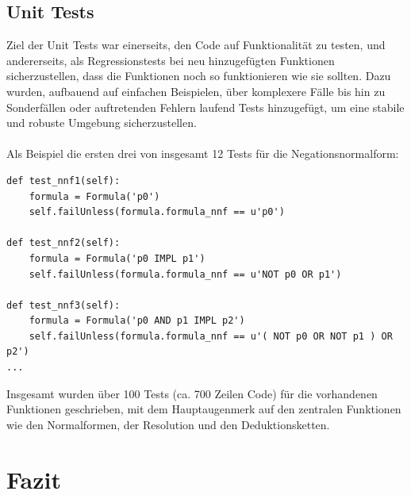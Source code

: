 \documentclass[11pt,a4paper,ngerman]{scrreprt}
\begin{document}
\section{Unit Tests}
Ziel der Unit Tests war einerseits, den Code auf Funktionalität zu testen, und andererseits, als Regressionstests bei neu hinzugefügten Funktionen sicherzustellen, dass die Funktionen noch so funktionieren wie sie sollten. Dazu wurden, aufbauend auf einfachen Beispielen, über komplexere Fälle bis hin zu Sonderfällen oder auftretenden Fehlern laufend Tests hinzugefügt, um eine stabile und robuste Umgebung sicherzustellen.\\\\
Als Beispiel die ersten drei von insgesamt 12 Tests für die Negationsnormalform:
\begin{lstlisting}
def test_nnf1(self):
    formula = Formula('p0')
    self.failUnless(formula.formula_nnf == u'p0')

def test_nnf2(self):
    formula = Formula('p0 IMPL p1')
    self.failUnless(formula.formula_nnf == u'NOT p0 OR p1')

def test_nnf3(self):
    formula = Formula('p0 AND p1 IMPL p2')
    self.failUnless(formula.formula_nnf == u'( NOT p0 OR NOT p1 ) OR p2')
...
\end{lstlisting}

Insgesamt wurden über 100 Tests (ca. 700 Zeilen Code) für die vorhandenen Funktionen geschrieben, mit dem Hauptaugenmerk auf den zentralen Funktionen wie den Normalformen, der Resolution und den Deduktionsketten.

\chapter{Fazit}  %
\end{document}

